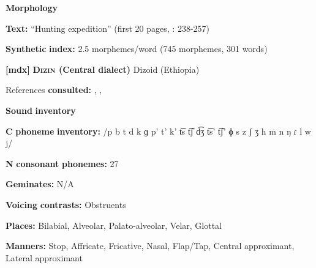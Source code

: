 \begin{styleBody}
\textbf{Morphology}
\end{styleBody}

\begin{styleBody}
\textbf{Text:} “Hunting expedition” (first 20 pages, \citealt{Whitehead2004}: 238-257)
\end{styleBody}

\begin{styleBody}
\textbf{Synthetic} \textbf{index:} 2.5 morphemes/word (745 morphemes, 301 words)
\end{styleBody}

\begin{styleBody}
\textbf{[mdx]}   \textbf{\textsc{Dizin} \textbf{(Central} \textbf{dialect)}}  Dizoid (Ethiopia)
\end{styleBody}

\begin{styleBody}
References \textbf{consulted:} \citet{Allan1976}, \citet{Beachy2005}, \citet{Breeze1988}
\end{styleBody}

\begin{styleBody}
\textbf{Sound} \textbf{inventory}
\end{styleBody}

\begin{styleBody}
\textbf{C} \textbf{phoneme} \textbf{inventory:} /p b t d k ɡ p’ t’ k’ t͡s t͡ʃ d͡ʒ t͡s’ t͡ʃ’ ɸ s z ʃ ʒ h m n ŋ ɾ l w j/
\end{styleBody}

\begin{styleBody}
\textbf{N} \textbf{consonant} \textbf{phonemes:} 27
\end{styleBody}

\begin{styleBody}
\textbf{Geminates:} N/A
\end{styleBody}

\begin{styleBody}
\textbf{Voicing} \textbf{contrasts:} Obstruents
\end{styleBody}

\begin{styleBody}
\textbf{Places:} Bilabial, Alveolar, Palato-alveolar, Velar, Glottal
\end{styleBody}

\begin{styleBody}
\textbf{Manners:} Stop, Affricate, Fricative, Nasal, Flap/Tap, Central approximant, Lateral approximant
\end{styleBody}

